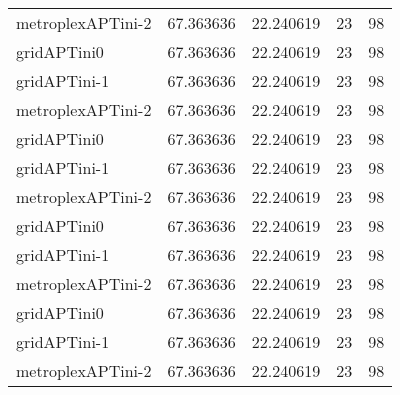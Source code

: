 \begin{table}[h]
\begin{longtable}{lrrrr}
metroplexAPTini-2 & 67.363636 & 22.240619 & 23 & 98 \\
gridAPTini0 & 67.363636 & 22.240619 & 23 & 98 \\
gridAPTini-1 & 67.363636 & 22.240619 & 23 & 98 \\
metroplexAPTini-2 & 67.363636 & 22.240619 & 23 & 98 \\
gridAPTini0 & 67.363636 & 22.240619 & 23 & 98 \\
gridAPTini-1 & 67.363636 & 22.240619 & 23 & 98 \\
metroplexAPTini-2 & 67.363636 & 22.240619 & 23 & 98 \\
gridAPTini0 & 67.363636 & 22.240619 & 23 & 98 \\
gridAPTini-1 & 67.363636 & 22.240619 & 23 & 98 \\
metroplexAPTini-2 & 67.363636 & 22.240619 & 23 & 98 \\
gridAPTini0 & 67.363636 & 22.240619 & 23 & 98 \\
gridAPTini-1 & 67.363636 & 22.240619 & 23 & 98 \\
metroplexAPTini-2 & 67.363636 & 22.240619 & 23 & 98 \\
\end{longtable}
\end{table}

